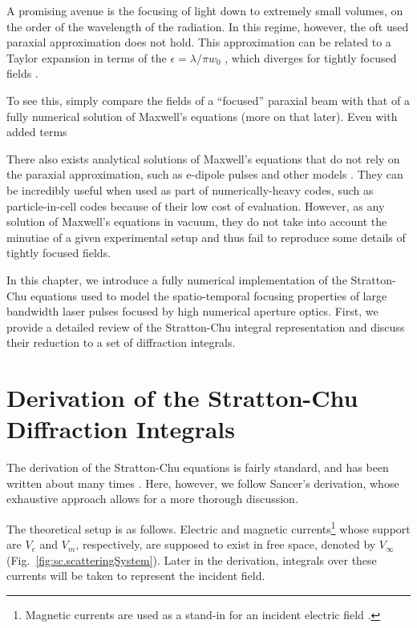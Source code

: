 \documentclass[11pt,SymmetricalJury]{inrsthesis/inrsthesis}
\begin{document}
A promising avenue is the focusing of light down to extremely small volumes, on the order
of the wavelength of the radiation. In this regime, however, the oft used paraxial approximation
does not hold. This approximation can be related to a Taylor expansion in terms
of the $\epsilon=\lambda/\pi w_0$ \cite{Lax1975}, which diverges for tightly focused
fields \cite{Borghi2003}.

To see this, simply compare the fields of a ``focused'' paraxial beam with that
of a fully numerical solution of Maxwell's equations (more on that later).
 Even with added terms 

There also exists analytical solutions of Maxwell's equations that do not rely
on the paraxial approximation, such as e-dipole pulses and other models
\cite{Gonoskov2012,Salamin2015a,Salamin2015b}. They can be incredibly useful when used as part of
numerically-heavy codes, such as particle-in-cell codes because of their low
cost of evaluation. However, as any solution of Maxwell's equations in vacuum,
they do not take into account the minutiae of a given experimental setup
and thus fail to reproduce some details of tightly focused fields.

In this chapter, we introduce a fully numerical implementation of the Stratton-Chu
equations used to model the spatio-temporal focusing properties of large
bandwidth laser pulses focused by high numerical aperture optics. First, we
provide a detailed review of the Stratton-Chu integral representation and discuss
their reduction to a set of diffraction integrals. 

\section{Derivation of the Stratton-Chu Diffraction Integrals}

The derivation of the Stratton-Chu equations is fairly standard, and has been
written about many times \cite{}. Here, however, we follow Sancer's derivation,
whose exhaustive approach allows for a more thorough discussion.

The theoretical setup is as follows. Electric and magnetic currents\footnote{Magnetic
currents are used as a stand-in for an incident electric field \cite{Schelkunoff1936}.}
whose support are $V_e$ and $V_m$, respectively, are supposed to exist in free
space, denoted by $V_\infty$ (Fig.~\ref{fig:sc.scatteringSystem}). Later in the
derivation, integrals over these currents will be taken to represent the incident
field.
\end{document}
